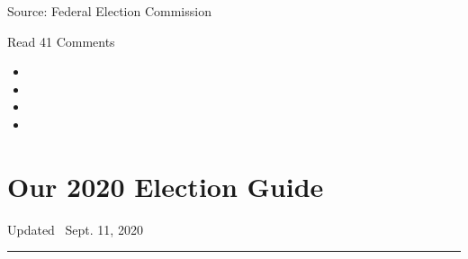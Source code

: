 Source: Federal Election Commission

Read 41 Comments

\begin{itemize}
\item
\item
\item
\item
\end{itemize}

\hypertarget{our-2020-election-guide}{%
\section{Our 2020 Election Guide}\label{our-2020-election-guide}}

Updated ~Sept. 11, 2020

\begin{center}\rule{0.5\linewidth}{\linethickness}\end{center}

